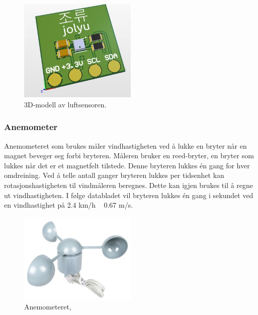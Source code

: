 \begin{figure}[H]
    \centering
    \includegraphics[width=0.5\textwidth]{implementering/luftsensor_3d.png}
    \caption{3D-modell av luftsensoren.}
    \label{fig:luftsensor_3d}
\end{figure}


\subsubsection{Anemometer}

Anemometeret som brukes måler vindhastigheten ved å lukke en bryter når en magnet beveger seg forbi bryteren. Måleren bruker en reed-bryter, en bryter som lukkes når det er et magnetfelt tilstede. Denne bryteren lukkes én gang for hver omdreining. Ved å telle antall ganger bryteren lukkes per tidsenhet kan rotasjonshastigheten til vindmåleren beregnes. Dette kan igjen brukes til å regne ut vindhastigheten. I følge databladet vil bryteren lukkes én gang i sekundet ved en vindhastighet på 2.4 km/h ~ 0.67 m/s.


\begin{figure}[H]
    \centering
    \includegraphics[width=0.5\textwidth]{implementering/anemometer.png}
    \caption{Anemometeret,}
    \label{fig:anemometer}
\end{figure}


